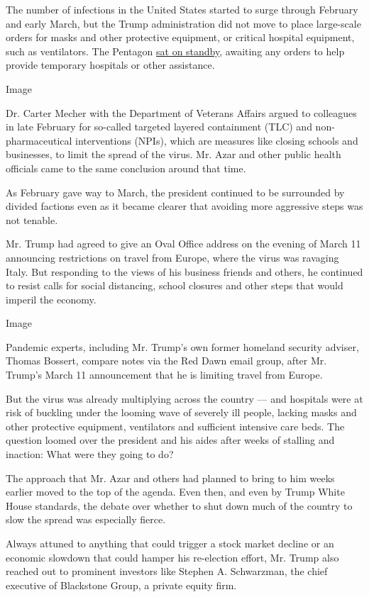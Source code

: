 The number of infections in the United States started to surge through
February and early March, but the Trump administration did not move to
place large-scale orders for masks and other protective equipment, or
critical hospital equipment, such as ventilators. The Pentagon
\href{https://www.nytimes.com/2020/03/17/us/politics/coronavirus-government-army-corps.html}{sat
on standby}, awaiting any orders to help provide temporary hospitals or
other assistance.

Image

Dr. Carter Mecher with the Department of Veterans Affairs argued to
colleagues in late February for so-called targeted layered containment
(TLC) and non-pharmaceutical interventions (NPIs), which are measures
like closing schools and businesses, to limit the spread of the virus.
Mr. Azar and other public health officials came to the same conclusion
around that time.

As February gave way to March, the president continued to be surrounded
by divided factions even as it became clearer that avoiding more
aggressive steps was not tenable.

Mr. Trump had agreed to give an Oval Office address on the evening of
March 11 announcing restrictions on travel from Europe, where the virus
was ravaging Italy. But responding to the views of his business friends
and others, he continued to resist calls for social distancing, school
closures and other steps that would imperil the economy.

Image

Pandemic experts, including Mr. Trump's own former homeland security
adviser, Thomas Bossert, compare notes via the Red Dawn email group,
after Mr. Trump's March 11 announcement that he is limiting travel from
Europe.

But the virus was already multiplying across the country --- and
hospitals were at risk of buckling under the looming wave of severely
ill people, lacking masks and other protective equipment, ventilators
and sufficient intensive care beds. The question loomed over the
president and his aides after weeks of stalling and inaction: What were
they going to do?

The approach that Mr. Azar and others had planned to bring to him weeks
earlier moved to the top of the agenda. Even then, and even by Trump
White House standards, the debate over whether to shut down much of the
country to slow the spread was especially fierce.

Always attuned to anything that could trigger a stock market decline or
an economic slowdown that could hamper his re-election effort, Mr. Trump
also reached out to prominent investors like Stephen A. Schwarzman, the
chief executive of Blackstone Group, a private equity firm.

